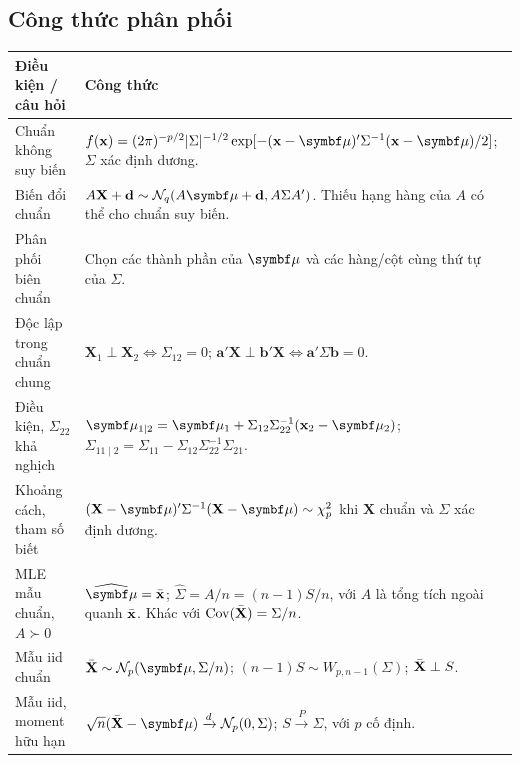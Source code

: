 \subsection{Công thức phân phối}
\begin{longtable}{L{.28\linewidth}L{.63\linewidth}}
\toprule
Điều kiện / câu hỏi & Công thức\\
\midrule
\endhead
Chuẩn không suy biến &
$f(\mathbf x)=(2\pi)^{-p/2}|\Sigma|^{-1/2}
 \exp[-(\mathbf x-\vmu)'\Sigma^{-1}(\mathbf x-\vmu)/2]$;
$\Sigma$ xác định dương.\\[4pt]
Biến đổi chuẩn & $A\mathbf X+\mathbf d\sim\N_q(A\vmu+\mathbf d,A\Sigma A')$.
Thiếu hạng hàng của $A$ có thể cho chuẩn suy biến.\\[4pt]
Phân phối biên chuẩn & Chọn các thành phần của $\vmu$ và các hàng/cột cùng thứ tự của $\Sigma$.\\[4pt]
Độc lập trong chuẩn chung & $\mathbf X_1\perp\mathbf X_2\iff\Sigma_{12}=0$;
$\mathbf a'\mathbf X\perp\mathbf b'\mathbf X\iff\mathbf a'\Sigma\mathbf b=0$.\\[4pt]
Điều kiện, $\Sigma_{22}$ khả nghịch &
$\vmu_{1\mid2}=\vmu_1+\Sigma_{12}\Sigma_{22}^{-1}(\mathbf x_2-\vmu_2)$;
$\Sigma_{11\mid2}=\Sigma_{11}-\Sigma_{12}\Sigma_{22}^{-1}\Sigma_{21}$.\\[4pt]
Khoảng cách, tham số biết & $(\mathbf X-\vmu)'\Sigma^{-1}(\mathbf X-\vmu)\sim\chi^2_p$
 khi $\mathbf X$ chuẩn và $\Sigma$ xác định dương.\\[4pt]
MLE mẫu chuẩn, $A\succ0$ & $\widehat{\vmu}=\xbar$;
$\widehat\Sigma=A/n=(n-1)S/n$, với $A$ là tổng tích ngoài quanh $\bar{\mathbf x}$.
Khác với $\operatorname{Cov}(\bar{\mathbf X})=\Sigma/n$.\\[4pt]
Mẫu iid chuẩn & $\Xbar\sim\N_p(\vmu,\Sigma/n)$;
$(n-1)S\sim W_{p,n-1}(\Sigma)$; $\bar{\mathbf X}\perp S$.\\[4pt]
Mẫu iid, moment hữu hạn & $\sqrt n(\Xbar-\vmu)\xrightarrow{d}\N_p(0,\Sigma)$;
$S\xrightarrow{P}\Sigma$, với $p$ cố định.\\
\bottomrule
\end{longtable}

